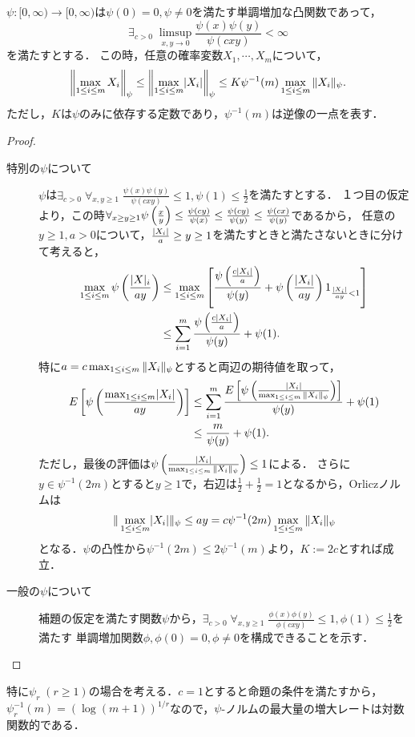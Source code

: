 \documentclass[uplatex,dvipdfmx]{jsreport}
\begin{document}
\begin{proposition}[最大不等式]\label{prop-max-inequality}
    $\psi:[0,\infty)\to[0,\infty)$は$\psi(0)=0,\psi\ne 0$を満たす単調増加な凸関数であって，\[\exists_{c>0}\;\limsup_{x,y\to 0}\frac{\psi(x)\psi(y)}{\psi(cxy)}<\infty\]を満たすとする．
    この時，任意の確率変数$X_1,\cdots,X_m$について，
    \[\left\|\max_{1\le i\le m}X_i\right\|_\psi\le\left\|\max_{1\le i\le m}\lvert X_i\rvert\right\|_\psi\le K\psi^{-1}(m)\max_{1\le i\le m}\|X_i\|_\psi.\]
    ただし，$K$は$\psi$のみに依存する定数であり，$\psi^{-1}(m)$は逆像の一点を表す．
\end{proposition}
\begin{proof}\mbox{}
    \begin{description}
        \item[特別の$\psi$について] 
        $\psi$は$\exists_{c>0}\;\forall_{x,y\ge 1}\;\frac{\psi(x)\psi(y)}{\psi(cxy)}\le 1,\psi(1)\le\frac{1}{2}$を満たすとする．
        １つ目の仮定より，この時$\forall_{x\ge y\ge 1}\psi\left(\frac{x}{y}\right)\le\frac{\psi(cy)}{\psi(x)}\le\frac{\psi(cy)}{\psi(y)}\le\frac{\psi(cx)}{\psi(y)}$であるから，
        任意の$y\ge 1,a>0$について，$\frac{\lvert X_i\rvert}{a}\ge y\ge 1$を満たすときと満たさないときに分けて考えると，
        \begin{align*}
            \max_{1\le i\le m}\psi\left(\frac{\lvert X\rvert_i}{ay}\right)&\le\max_{1\le i\le m}\left[\frac{\psi\left(\frac{c\lvert X_i\rvert}{a}\right)}{\psi(y)}+\psi\left(\frac{\lvert X_i\rvert}{ay}\right)1_{\frac{\lvert X_i\rvert}{ay}<1}\right]\\
            &\le\sum^m_{i=1}\frac{\psi\left(\frac{c\lvert X_i\rvert}{a}\right)}{\psi(y)}+\psi(1).
        \end{align*}
        特に$a=c\max_{1\le i\le m}\|X_i\|_\psi$とすると両辺の期待値を取って，
        \begin{align*}
            E\left[\psi\left(\frac{\max_{1\le i\le m}\lvert X_i\rvert}{ay}\right)\right]&\le\sum^m_{i=1}\frac{E\left[\psi\left(\frac{\lvert X_i\rvert}{\max_{1\le i\le m}\|X_i\|_\psi}\right)\right]}{\psi(y)}+\psi(1)\\
            &\le\frac{m}{\psi(y)}+\psi(1).
        \end{align*}
        ただし，最後の評価は$\psi\left(\frac{\lvert X_i\rvert}{\max_{1\le i\le m}\|X_i\|_\psi}\right)\le1$による．
        さらに$y\in\psi^{-1}(2m)$とすると$y\ge1$で，右辺は$\frac{1}{2}+\frac{1}{2}=1$となるから，Orliczノルムは
        \[\|\max_{1\le i\le m}\lvert X_i\rvert\|_\psi\le ay=c\psi^{-1}(2m)\max_{1\le i\le m}\|X_i\|_\psi\]
        となる．$\psi$の凸性から$\psi^{-1}(2m)\le 2\psi^{-1}(m)$より，$K:=2c$とすれば成立．
        \item[一般の$\psi$について]
        補題の仮定を満たす関数$\psi$から，$\exists_{c>0}\;\forall_{x,y\ge 1}\;\frac{\phi(x)\phi(y)}{\phi(cxy)}\le 1,\phi(1)\le\frac{1}{2}$を満たす
        単調増加関数$\phi,\phi(0)=0,\phi\ne 0$を構成できることを示す．
    \end{description}
\end{proof}
\begin{remarks}[確率変数列の最大値という特性量の振る舞いの記述]
    特に$\psi_r\;(r\ge 1)$の場合を考える．$c=1$とすると命題の条件を満たすから，
    $\psi_r^{-1}(m)=(\log (m+1))^{1/r}$なので，$\psi$-ノルムの最大量の増大レートは対数関数的である．
\end{remarks}
\end{document}
